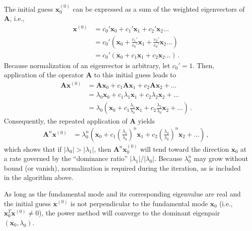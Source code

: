 The initial guess $\mathbf{x}^{(0)}_0$ can be expressed as a sum of the weighted eigenvectors of $\mathbf{A}$, i.e.,
\begin{equation}
\begin{split}
  \mathbf{x}^{(0)} 
     &=  c_0' \mathbf{x}_0 + c_1' \mathbf{x}_1 + c_2'  \mathbf{x}_2 \ldots \,  \\
     &=  c_0' \left (\mathbf{x}_0 + \frac{c_1'}{c_0'} \mathbf{x}_1 + \frac{c_2'}{c_0'} \mathbf{x}_2 \ldots  \right ) \\
     &=  c_0' \left (\mathbf{x}_0 + c_1 \mathbf{x}_1 + c_2 \mathbf{x}_2 \ldots  \right )\, .         
\end{split}
\end{equation}
Because normalization of an eigenvector is arbitrary, let $c_0' = 1$.
Then, application of the operator $\mathbf{A}$ to this initial guess leads to 
\begin{equation}
\begin{split}
  \mathbf{A} \mathbf{x}^{(0)} 
   &=  \mathbf{A} \mathbf{x}_0  +  c_1 \mathbf{A} \mathbf{x}_1 + c_2 \mathbf{A} \mathbf{x}_2 + \ldots \\
   &= \lambda_0 \mathbf{x}_0 + c_1 \lambda_1 \mathbf{x}_1 + c_2 \lambda_2 \mathbf{x}_2 + \ldots \\ 
   &= \lambda_0 \left ( \mathbf{x}_0 + c_1 \frac{\lambda_1}{\lambda_0} \mathbf{x}_1 + c_2 \frac{\lambda_2}{\lambda_0} \mathbf{x}_2 + \ldots \right ) \, .
\end{split}
\end{equation}
Consequently, the repeated application of $\mathbf{A}$ yields
\begin{equation}
\begin{split}
  \mathbf{A}^n \mathbf{x}^{(0)} 
   &= \lambda^n_0 \left ( \mathbf{x}_0 + c_1 \left( \frac{\lambda_1}{\lambda_0} \right)^n \mathbf{x}_1 + c_2 \left ( \frac{\lambda_2}{\lambda_0} \right )^n \mathbf{x}_2 + \ldots \right ) \, ,
\end{split}
\end{equation}
which shows that if $|\lambda_0| > |\lambda_1|$, then $\mathbf{A}^n \mathbf{x}^{(0)}_0$ will tend toward the direction $\mathbf{x}_0$ at a rate governed by the ``dominance ratio'' $|\lambda_1|/|\lambda_0|$. 
Because $\lambda^n_0$ may grow without bound (or vanish), normalization is required during the iteration, as is included in the algorithm above.

As long as the fundamental mode and its corresponding eigenvalue are real and the initial guess $\mathbf{x}^{(0)}$ is not perpendicular to the fundamental mode $\mathbf{x}_0$ (i.e., $\mathbf{x}^T_0\mathbf{x}^{(0)} \neq 0$), the power method will converge to the dominant eigenpair $(\mathbf{x}_0, \lambda_0)$.

